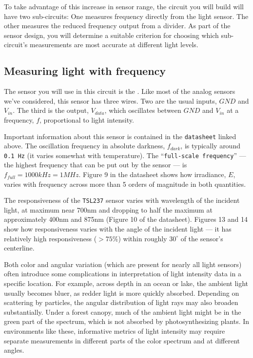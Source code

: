 To take advantage of this increase in sensor range, the circuit you will build will have two sub-circuits: One measures frequency directly from the light sensor.
The other measures the reduced frequency output from a divider. 
As part of the sensor design, you will determine a suitable criterion for choosing which sub-circuit's measurements are most accurate at different light levels.

\subsection{Measuring light with frequency}
The sensor you will use in this circuit is the .
Like most of the analog sensors we've considered, this sensor has three wires.
Two are the usual inputs, $GND$ and $V_{in}$. 
The third is the output, $V_{data}$, which oscillates between $GND$ and $V_{in}$ at a frequency, $f$, proportional to light intensity.

Important information about this sensor is contained in the \texttt{datasheet} linked above.
The oscillation frequency in absolute darkness, $f_{dark}$, is typically around \texttt{0.1 Hz} (it varies somewhat with temperature).
The ``\texttt{full-scale frequency}'' --- the highest frequency that can be put out by the sensor --- is $f_{full}=1000kHz=1MHz$.
Figure 9 in the datasheet shows how irradiance, $E$, varies with frequency across more than 5 orders of magnitude in both quantities.

The responsiveness of the \texttt{TSL237} sensor varies with wavelength of the incident light, at maximum near 700nm and dropping to half the maximum at approximately 400nm and 875nm (Figure 10 of the datasheet).
Figures 13 and 14 show how responsiveness varies with the angle of the incident light --- it has relatively high responsiveness ($>75\%$) within roughly $30^\circ$ of the sensor's centerline.

Both color and angular variation (which are present for nearly all light sensors) often introduce some complications in interpretation of light intensity data in a specific location.
For example, across depth in an ocean or lake, the ambient light usually becomes bluer, as redder light is more quickly absorbed.
Depending on scattering by particles, the angular distribution of light rays may also broaden substantially.
Under a forest canopy, much of the ambient light might be in the green part of the spectrum, which is not absorbed by photosynthesizing plants.
In environments like these, informative metrics of light intensity may require separate measurements in different parts of the color spectrum and at different angles.

